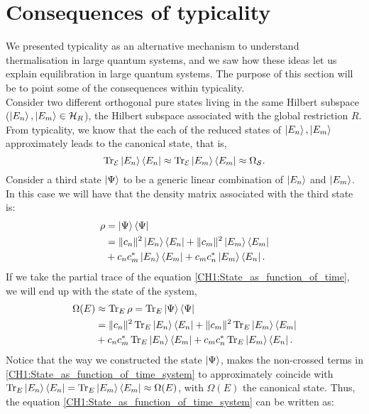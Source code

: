 \section{Consequences of typicality}
We presented typicality as an alternative mechanism to understand thermalisation in large quantum systems, and we saw how these ideas let us explain equilibration in large quantum systems. The purpose of this section will be to point some of the consequences within typicality.\\
\indent Consider two different orthogonal pure states living in the same Hilbert subspace ($\mathinner{|{E_n}\rangle},\mathinner{|{E_m}\rangle} \in \mathcal{H}_{R}$), the Hilbert subspace associated with the global restriction $R$. From typicality, we know that the each of the reduced states of $\mathinner{|{E_n}\rangle},\mathinner{|{E_m}\rangle}$ approximately leads to the canonical state, that is,
\begin{equation}
\operatorname{Tr}_{\mathcal{E}} \mathinner{|{E_n}\rangle}\mathinner{\langle{E_n}|} \approx \operatorname{Tr}_{\mathcal{E}} \mathinner{|{E_m}\rangle}\mathinner{\langle{E_m}|} \approx \Omega_{\mathcal{S}}.
\end{equation}
Consider a third state $\mathinner{|{\Psi}\rangle}$ to be a generic linear combination of $\mathinner{|{E_n}\rangle}$ and $\mathinner{|{E_m}\rangle}$. In this case we will have that the density matrix associated with the third state is:
\begin{equation}
\begin{aligned}
\rho &= \mathinner{|{\Psi}\rangle}\mathinner{\langle{\Psi}|}\\
&= \|c_n\|^2 \mathinner{|{E_n}\rangle}\mathinner{\langle{E_n}|} +  \|c_m\|^2 \mathinner{|{E_m}\rangle}\mathinner{\langle{E_m}|} \\
& + c_n c^{*}_m  \mathinner{|{E_n}\rangle}\mathinner{\langle{E_m}|}+ c_m c^{*}_n \mathinner{|{E_m}\rangle}\mathinner{\langle{E_n}|}.
\end{aligned}
\label{CH1:State_as_function_of_time}
\end{equation}
If we take the partial trace of the equation \eqref{CH1:State_as_function_of_time}, we will end up with the state of the system,
\begin{equation}
\begin{aligned}
\Omega(E) &\approx \operatorname{Tr}_E \rho = \operatorname{Tr}_E  \mathinner{|{\Psi}\rangle}\mathinner{\langle{\Psi}|}\\
&= \|c_n\|^2\operatorname{Tr}_E  \mathinner{|{E_n}\rangle}\mathinner{\langle{E_n}|} +  \|c_m\|^2 \operatorname{Tr}_E \mathinner{|{E_m}\rangle}\mathinner{\langle{E_m}|} \\
& + c_n c^{*}_m  \operatorname{Tr}_E \mathinner{|{E_n}\rangle}\mathinner{\langle{E_m}|} + c_m c^{*}_n \operatorname{Tr}_E \mathinner{|{E_m}\rangle}\mathinner{\langle{E_n}|}.
\end{aligned}
\label{CH1:State_as_function_of_time_system}
\end{equation}
\indent  Notice that the way we constructed the state $\mathinner{|{\Psi}\rangle}$, makes the non-crossed terms in \eqref{CH1:State_as_function_of_time_system} to approximately  coincide with $\operatorname{Tr}_E \mathinner{|{E_n}\rangle}\mathinner{\langle{E_n}|} =\operatorname{Tr}_E \mathinner{|{E_m}\rangle}\mathinner{\langle{E_m}|} \approx \Omega(E)$, with $\Omega(E)$ the canonical state. Thus, the equation \eqref{CH1:State_as_function_of_time_system} can be written as:
